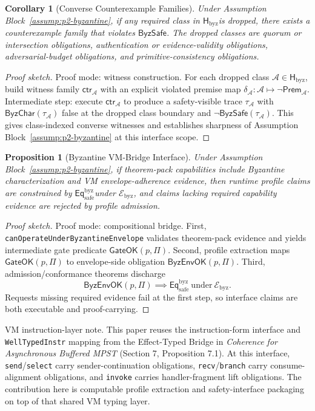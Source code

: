 \documentclass[a4paper,10pt,twocolumn,english]{article}
\numberwithin{equation}{section}
\theoremstyle{paperdef}
\theoremstyle{paperplain}
\newtheorem{proposition}[definition]{Proposition}
\newtheorem{corollary}[definition]{Corollary}
\theoremstyle{paperdef}
\theoremstyle{paperremark}
\newcommand{\Hbyz}{\ensuremath{\mathsf{H}_{\mathrm{byz}}}}
\newcommand{\Eqsafe}{\ensuremath{\mathsf{Eq}_{\mathrm{safe}}^{\mathrm{byz}}}}
\newcommand{\Ebyz}{\ensuremath{\mathcal{E}_{\mathrm{byz}}}}
\newcommand{\ByzSafe}{\ensuremath{\mathsf{ByzSafe}}}
\newcommand{\ByzChar}{\ensuremath{\mathsf{ByzChar}}}
\begin{document}
\begin{corollary}[Converse Counterexample Families]
	\label{cor:converse}
	Under Assumption Block~\ref{assump:p2-byzantine}, if any required class in \Hbyz is dropped, there exists a counterexample family that violates \ByzSafe. The dropped classes are quorum or intersection obligations, authentication or evidence-validity obligations, adversarial-budget obligations, and primitive-consistency obligations.
\end{corollary}

\begin{proof}[Proof sketch]
	Proof mode: witness construction.
	For each dropped class $\mathcal{A}\in\Hbyz$, build witness family
	$\mathsf{ctr}_{\mathcal{A}}$ with an explicit violated premise map
	$\delta_{\mathcal{A}}:\mathcal{A}\mapsto \neg \mathsf{Prem}_{\mathcal{A}}$.
	Intermediate step: execute $\mathsf{ctr}_{\mathcal{A}}$ to produce a
	safety-visible trace $\tau_{\mathcal{A}}$ with
	$\ByzChar(\tau_{\mathcal{A}})$ false at the dropped class boundary and
	$\neg \ByzSafe(\tau_{\mathcal{A}})$. This gives class-indexed converse
	witnesses and establishes sharpness of Assumption
	Block~\ref{assump:p2-byzantine} at this interface scope.
\end{proof}

\begin{proposition}[Byzantine VM-Bridge Interface]
	\label{prop:vm-bridge}
	Under Assumption Block~\ref{assump:p2-byzantine}, if theorem-pack capabilities include Byzantine characterization and VM envelope-adherence evidence, then runtime profile claims are constrained by \Eqsafe under \Ebyz, and claims lacking required capability evidence are rejected by profile admission.
\end{proposition}

\begin{proof}[Proof sketch]
	Proof mode: compositional bridge.
	First, \texttt{canOperateUnderByzantineEnvelope} validates theorem-pack
	evidence and yields intermediate gate predicate
	$\mathsf{GateOK}(p,\Pi)$. Second, profile extraction maps
	$\mathsf{GateOK}(p,\Pi)$ to envelope-side obligation
	$\mathsf{ByzEnvOK}(p,\Pi)$. Third, admission/conformance theorems discharge
	\[
		\mathsf{ByzEnvOK}(p,\Pi)\implies \Eqsafe\ \text{under}\ \Ebyz.
	\]
	Requests missing required evidence fail at the first step, so interface claims
	are both executable and proof-carrying.
\end{proof}

VM instruction-layer note. This paper reuses the instruction-form interface and \texttt{WellTypedInstr} mapping from the Effect-Typed Bridge in \emph{Coherence for Asynchronous Buffered MPST} (Section 7, Proposition 7.1). At this interface, \texttt{send}/\texttt{select} carry sender-continuation obligations, \texttt{recv}/\texttt{branch} carry consume-alignment obligations, and \texttt{invoke} carries handler-fragment lift obligations. The contribution here is computable profile extraction and safety-interface packaging on top of that shared VM typing layer.
\end{document}
